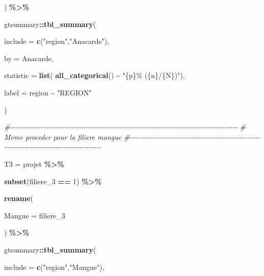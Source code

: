 \documentclass[
]{article}
\newenvironment{Shaded}{\begin{snugshade}}{\end{snugshade}}
\newcommand{\AttributeTok}[1]{\textcolor[rgb]{0.13,0.29,0.53}{#1}}
\newcommand{\CommentTok}[1]{\textcolor[rgb]{0.56,0.35,0.01}{\textit{#1}}}
\newcommand{\DecValTok}[1]{\textcolor[rgb]{0.00,0.00,0.81}{#1}}
\newcommand{\FunctionTok}[1]{\textcolor[rgb]{0.13,0.29,0.53}{\textbf{#1}}}
\newcommand{\NormalTok}[1]{#1}
\newcommand{\OtherTok}[1]{\textcolor[rgb]{0.56,0.35,0.01}{#1}}
\newcommand{\SpecialCharTok}[1]{\textcolor[rgb]{0.81,0.36,0.00}{\textbf{#1}}}
\newcommand{\StringTok}[1]{\textcolor[rgb]{0.31,0.60,0.02}{#1}}
\begin{document}
\begin{Shaded}
\begin{Highlighting}[]
\NormalTok{  ) }\SpecialCharTok{\%\textgreater{}\%} 
  
\NormalTok{  gtsummary}\SpecialCharTok{::}\FunctionTok{tbl\_summary}\NormalTok{(}
    
  \AttributeTok{include =} \FunctionTok{c}\NormalTok{(}\StringTok{"region"}\NormalTok{,}\StringTok{"Anacarde"}\NormalTok{),}
  
  \AttributeTok{by =}\NormalTok{ Anacarde,}
  
  \AttributeTok{statistic =} \FunctionTok{list}\NormalTok{( }\FunctionTok{all\_categorical}\NormalTok{() }\SpecialCharTok{\textasciitilde{}} \StringTok{"\{p\}\% (\{n\}/\{N\})"}\NormalTok{),}
  
  \AttributeTok{label =}\NormalTok{ region }\SpecialCharTok{\textasciitilde{}} \StringTok{"REGION"}

\NormalTok{)}





\CommentTok{\#{-}{-}{-}{-}{-}{-}{-}{-}{-}{-}{-}{-}{-}{-}{-}{-}{-}{-}{-}{-}{-}{-}{-}{-}{-}{-}{-}{-}{-}{-}{-}{-}{-}{-}{-}{-}{-}{-}{-}{-}{-}{-}{-}{-}{-}{-}{-}{-}{-}{-}{-}{-}{-}{-}{-}{-}{-}{-}{-}{-}{-}{-}{-}{-}{-}{-}{-}{-}{-}{-}{-}{-}{-}{-}{-}{-}{-}{-}{-}{-}{-}{-}{-}{-}{-}{-}{-}{-}{-}}
\CommentTok{\#     Meme proceder pour la filiere mangue}
\CommentTok{\#{-}{-}{-}{-}{-}{-}{-}{-}{-}{-}{-}{-}{-}{-}{-}{-}{-}{-}{-}{-}{-}{-}{-}{-}{-}{-}{-}{-}{-}{-}{-}{-}{-}{-}{-}{-}{-}{-}{-}{-}{-}{-}{-}{-}{-}{-}{-}{-}{-}{-}{-}{-}{-}{-}{-}{-}{-}{-}{-}{-}{-}{-}{-}{-}{-}{-}{-}{-}{-}{-}{-}{-}{-}{-}{-}{-}{-}{-}{-}{-}{-}{-}{-}{-}{-}{-}{-}{-}{-}}





\NormalTok{T3 }\OtherTok{=}\NormalTok{ projet }\SpecialCharTok{\%\textgreater{}\%}
  
  \FunctionTok{subset}\NormalTok{(filiere\_3 }\SpecialCharTok{==} \DecValTok{1}\NormalTok{) }\SpecialCharTok{\%\textgreater{}\%} 
  
  \FunctionTok{rename}\NormalTok{(}
    
    \AttributeTok{Mangue =}\NormalTok{ filiere\_3}
    
\NormalTok{  ) }\SpecialCharTok{\%\textgreater{}\%} 
  
\NormalTok{  gtsummary}\SpecialCharTok{::}\FunctionTok{tbl\_summary}\NormalTok{(}
  
    \AttributeTok{include =} \FunctionTok{c}\NormalTok{(}\StringTok{"region"}\NormalTok{,}\StringTok{"Mangue"}\NormalTok{),}
  

\end{Highlighting}
\end{Shaded}
\end{document}
